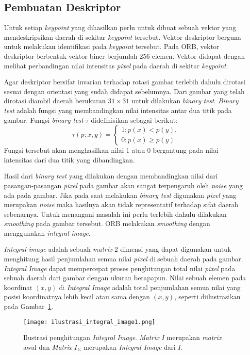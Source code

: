 \subsection{Pembuatan Deskriptor}
\label{subsec:orb_deskriptor}
Untuk setiap \textit{keypoint} yang dihasilkan perlu untuk dibuat sebuah vektor yang mendeskripsikan daerah di sekitar \textit{keypoint} tersebut. Vektor deskriptor berguna untuk melakukan identifikasi pada \textit{keypoint} tersebut. Pada ORB, vektor deskriptor berbentuk vektor biner berjumlah 256 elemen. Vektor didapat dengan melihat perbandingan nilai intensitas \textit{pixel} pada daerah di sekitar \textit{keypoint}.

Agar deskriptor bersifat invarian terhadap rotasi gambar terlebih dahulu dirotasi sesuai dengan orientasi yang sudah didapat sebelumnya. Dari gambar yang telah dirotasi diambil daerah berukuran $31\times31$ untuk dilakukan \textit{binary test}. \textit{Binary test} adalah fungsi yang membandingkan nilai intensitas antar dua titik pada gambar. Fungsi \textit{binary test} $\tau$ didefinisikan sebagai berikut:
\begin{equation}
	\tau(p;x,y)=\begin{cases}
		1 :p(x) < p(y), \\
		0 :p(x) \geq p(y)
	\end{cases}
\end{equation}
Fungsi tersebut akan menghasilkan nilai $1$ atau $0$ bergantung pada nilai intensitas dari dua titik yang dibandingkan.

Hasil dari \textit{binary test} yang dilakukan dengan membandingkan nilai dari pasangan-pasangan \textit{pixel} pada gambar akan sangat terpengaruh oleh \textit{noise} yang ada pada gambar. Jika pada saat melakukan \textit{binary test} digunakan \textit{pixel} yang merupakan \textit{noise} maka hasilnya akan tidak representatif terhadap sifat daerah sebenarnya. Untuk menangani masalah ini perlu terlebih dahulu dilakukan \textit{smoothing} pada gambar tersebut. ORB melakukan \textit{smoothing} dengan menggunakan \textit{integral image}. 

\textit{Integral image} adalah sebuah \textit{matrix} 2 dimensi yang dapat digunakan untuk menghitung hasil penjumlahan semua nilai \textit{pixel} di sebuah daerah pada gambar. \textit{Integral Image} dapat mempercepat proses penghitungan total nilai \textit{pixel} pada sebuah daerah dari gambar dengan ukuran berapapun. Nilai sebuah elemen pada koordinat $(x,y)$ di \textit{Integral Image} adalah total penjumlahan semua nilai yang posisi koordinatnya lebih kecil atau sama dengan $(x,y)$, seperti diilustrasikan pada Gambar~\ref{fig:integral_image1}.
\begin{figure}[H]
	\centering
	\texttt{[image: ilustrasi\_integral\_image1.png]}
	\caption{Ilustrasi penghitungan \textit{Integral Image}. \textit{Matrix} $I$ merupakan \textit{matrix} awal dan \textit{Matrix} $I_\Sigma$ merupakan \textit{Integral Image} dari $I$.}
	\label{fig:integral_image1}
\end{figure}

